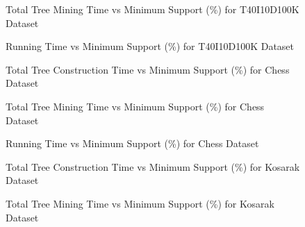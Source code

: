             \begin{figure}[h]
            \centering
                
            \caption{Total Tree Mining Time vs Minimum Support (\%) for T40I10D100K Dataset }
            \label{result:g_t10_mining_total}
            \end{figure}
            
            \begin{figure}[h]
            \centering
                
            \caption{Running Time vs Minimum Support (\%) for T40I10D100K Dataset }
            \label{result:g_t10_total}
            \end{figure}
    
            \begin{figure}[h]
            \centering
                
            \caption{Total Tree Construction Time vs Minimum Support (\%) for Chess Dataset }
            \label{result:g_chess_tree_construction_total}
            \end{figure}
            
            \begin{figure}[h]
            \centering
                
            \caption{Total Tree Mining Time vs Minimum Support (\%) for Chess Dataset }
            \label{result:g_chess_mining_total}
            \end{figure}
            
            \begin{figure}[h]
            \centering
                
            \caption{Running Time vs Minimum Support (\%) for Chess Dataset }
            \label{result:g_chess_total}
            \end{figure}
            \begin{figure}[h]
            \centering
                
            \caption{Total Tree Construction Time vs Minimum Support (\%) for Kosarak Dataset }
            \label{result:g_k_tree_construction_total}
            \end{figure}
            
            \begin{figure}[h]
            \centering
                
            \caption{Total Tree Mining Time vs Minimum Support (\%) for Kosarak Dataset }
            \label{result:g_k_mining_total}
            \end{figure}

